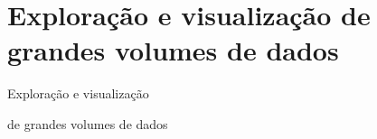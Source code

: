 \documentclass{beamer}
\begin{document}
\section{Exploração e visualização de grandes volumes de dados}
\begin{frame}
\Huge{\centerline{Exploração e visualização}}
\Huge{\centerline{de grandes volumes de dados}}
\end{frame}
\end{document}
